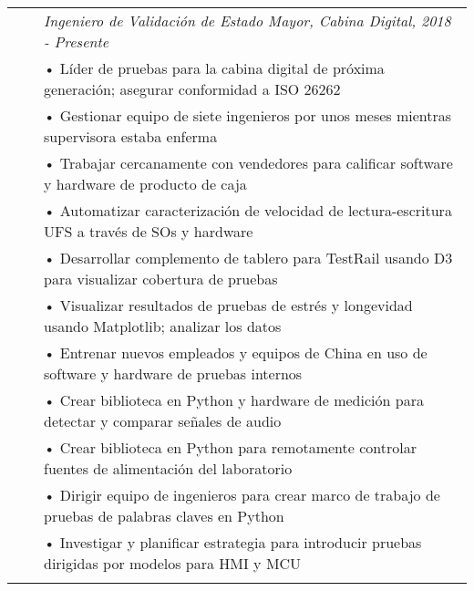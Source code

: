 \documentclass{minimal}
\begin{document}
\begin{tabular}{ p{1.5cm} p{1cm} p{16cm} }
& & \textit{Ingeniero de Validación de Estado Mayor, Cabina Digital, 2018 - Presente}\\
& & • Líder de pruebas para la cabina digital de próxima generación; asegurar conformidad a ISO 26262\\
& & • Gestionar equipo de siete ingenieros por unos meses mientras supervisora estaba enferma\\
& & • Trabajar cercanamente con vendedores para calificar software y hardware de producto de caja\\
& & • Automatizar caracterización de velocidad de lectura-escritura UFS a través de SOs y hardware\\
& & • Desarrollar complemento de tablero para TestRail usando D3 para visualizar cobertura de pruebas\\
& & • Visualizar resultados de pruebas de estrés y longevidad usando Matplotlib; analizar los datos\\
& & • Entrenar nuevos empleados y equipos de China en uso de software y hardware de pruebas internos\\
& & • Crear biblioteca en Python y hardware de medición para detectar y comparar señales de audio\\
& & • Crear biblioteca en Python para remotamente controlar fuentes de alimentación del laboratorio\\
& & • Dirigir equipo de ingenieros para crear marco de trabajo de pruebas de palabras claves en Python\\
& & • Investigar y planificar estrategia para introducir pruebas dirigidas por modelos para HMI y MCU\\
& & \\
\end{tabular}
\end{document}
